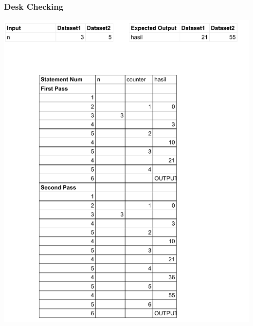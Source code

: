 \documentclass[
  12pt,
  answers  
]{exam}
\begin{document}
	\subsubsection*{Desk Checking}
	\begin{center}
		\includegraphics{pdf/Problem2DC.pdf}
	\end{center}
\end{document}
